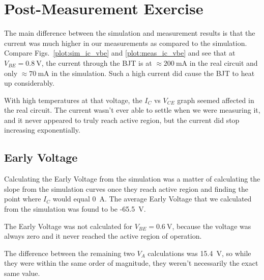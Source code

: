 \documentclass{../../ece-report}
\begin{document}
\section{Post-Measurement Exercise}

The main difference between the simulation and measurement
results is that the current was much higher in our measurements
as compared to the simulation. Compare Figs.~\ref{plot:sim_ic_vbe}
and \ref{plot:meas_ic_vbe} and see that at $V_{BE} = 0.8~\si{\V}$,
the current through the BJT is at $\approx 200~\si{\mA}$ in the real
circuit and only $\approx 70~\si{\mA}$ in the simulation. Such a high
current did cause the BJT to heat up considerably. 

With high temperatures at that voltage, the $I_C$ vs
$V_{CE}$ graph seemed affected in the real circuit.
The current wasn't ever able to settle when we were
measuring it, and it never appeared to truly reach active
region, but the current did stop increasing exponentially.

\subsection*{Early Voltage}

Calculating the Early Voltage from the simulation was
a matter of calculating the slope from the simulation curves
once they reach active region and finding the point where $I_C$ 
would equal 0~A. The average Early Voltage that we calculated
from the simulation was found to be -65.5~V.

The Early Voltage was not calculated for $V_{BE} = 0.6~\si{\V}$,
because the voltage was always zero and it never reached
the active region of operation.

The difference between the remaining two $V_A$ calculations was
15.4~V, so while they were within the same order of magnitude, they
weren't necessarily the exact same value.
\end{document}
